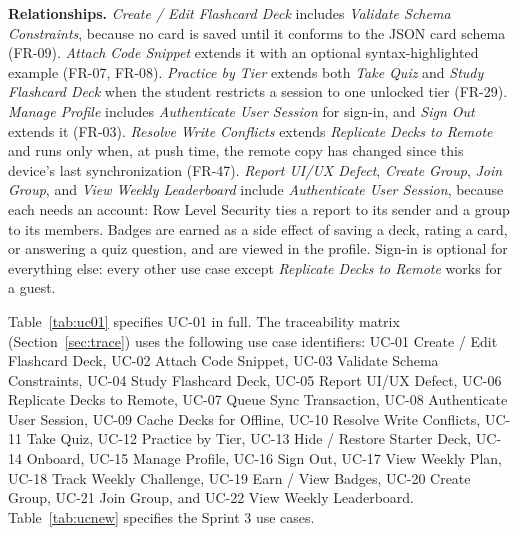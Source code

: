 \documentclass[12pt,letterpaper]{article}
\begin{document}
\textbf{Relationships.} \emph{Create / Edit Flashcard Deck} includes \emph{Validate
Schema Constraints}, because no card is saved until it conforms to the JSON card schema
(FR-09). \emph{Attach Code Snippet} extends it with an optional syntax-highlighted
example (FR-07, FR-08). \emph{Practice by Tier} extends both \emph{Take Quiz} and
\emph{Study Flashcard Deck} when the student restricts a session to one unlocked tier
(FR-29). \emph{Manage Profile} includes \emph{Authenticate User Session} for sign-in,
and \emph{Sign Out} extends it (FR-03). \emph{Resolve Write Conflicts} extends
\emph{Replicate Decks to Remote} and runs only when, at push time, the remote copy has
changed since this device's last synchronization (FR-47). \emph{Report UI/UX Defect},
\emph{Create Group}, \emph{Join Group}, and \emph{View Weekly Leaderboard} include
\emph{Authenticate User Session}, because each needs an account: Row Level Security
ties a report to its sender and a group to its members. Badges are earned as a side
effect of saving a deck, rating a card, or answering a quiz question, and are viewed
in the profile. Sign-in is optional for everything else: every other use case except
\emph{Replicate Decks to Remote} works for a guest.

Table~\ref{tab:uc01} specifies UC-01 in full. The traceability matrix
(Section~\ref{sec:trace}) uses the following use case identifiers: UC-01 Create / Edit
Flashcard Deck, UC-02 Attach Code Snippet, UC-03 Validate Schema Constraints, UC-04
Study Flashcard Deck, UC-05 Report UI/UX Defect, UC-06 Replicate Decks to Remote, UC-07
Queue Sync Transaction, UC-08 Authenticate User Session, UC-09 Cache Decks for Offline,
UC-10 Resolve Write Conflicts, UC-11 Take Quiz, UC-12 Practice by Tier, UC-13 Hide /
Restore Starter Deck, UC-14 Onboard, UC-15 Manage Profile, UC-16 Sign Out, UC-17 View
Weekly Plan, UC-18 Track Weekly Challenge, UC-19 Earn / View Badges, UC-20 Create Group,
UC-21 Join Group, and UC-22 View Weekly Leaderboard. Table~\ref{tab:ucnew} specifies the
Sprint 3 use cases.
\end{document}
